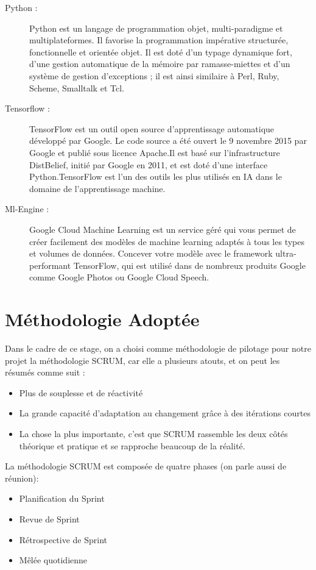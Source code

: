 \begin{description}
\item[Python : ] Python est un langage de programmation objet, multi-paradigme et multiplateformes. Il favorise la programmation impérative structurée, fonctionnelle et orientée objet. Il est doté d'un typage dynamique fort, d'une gestion automatique de la mémoire par ramasse-miettes et d'un système de gestion d'exceptions ; il est ainsi similaire à Perl, Ruby, Scheme, Smalltalk et Tcl.
\item[Tensorflow : ]TensorFlow est un outil open source d'apprentissage automatique développé par Google. Le code source a été ouvert le 9 novembre 2015 par Google et publié sous licence Apache.Il est basé sur l'infrastructure DistBelief, initié par Google en 2011, et est doté d'une interface Python.TensorFlow est l'un des outils les plus utilisés en IA dans le domaine de l'apprentissage machine.
\item[Ml-Engine : ]Google Cloud Machine Learning est un service géré qui vous permet de créer facilement des modèles de machine learning adaptés à tous les types et volumes de données. Concever votre modèle avec le framework ultra-performant TensorFlow, qui est utilisé dans de nombreux produits Google comme Google Photos ou Google Cloud Speech. 
\end{description}
\section{Méthodologie Adoptée}
Dans le cadre de ce stage, on a choisi comme méthodologie de pilotage pour notre projet la méthodologie SCRUM, car elle a plusieurs atouts, et on peut les résumés comme suit :
\begin{itemize}
\item Plus de souplesse et de réactivité
\item La grande capacité d’adaptation au changement grâce à des itérations courtes
\item La chose la plus importante, c’est que SCRUM rassemble les deux côtés théorique et pratique et se rapproche beaucoup de la réalité.
\end{itemize}

La méthodologie SCRUM est composée de quatre phases (on parle aussi de réunion):
\begin{itemize}
\item Planification du Sprint
\item Revue de Sprint
\item Rétrospective de Sprint
\item Mêlée quotidienne
\end{itemize}
